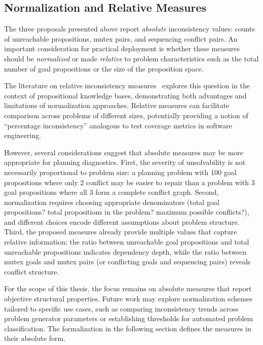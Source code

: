 \subsection{Normalization and Relative Measures}

The three proposals presented above report \emph{absolute} inconsistency values: counts of unreachable propositions, mutex pairs, and sequencing conflict pairs. An important consideration for practical deployment is whether these measures should be \emph{normalized} or made \emph{relative} to problem characteristics such as the total number of goal propositions or the size of the proposition space.

The literature on relative inconsistency measures~\cite{Besnard2020} explores this question in the context of propositional knowledge bases, demonstrating both advantages and limitations of normalization approaches. Relative measures can facilitate comparison across problems of different sizes, potentially providing a notion of ``percentage inconsistency'' analogous to test coverage metrics in software engineering.

However, several considerations suggest that absolute measures may be more appropriate for planning diagnostics. First, the severity of unsolvability is not necessarily proportional to problem size: a planning problem with 100 goal propositions where only 2 conflict may be easier to repair than a problem with 3 goal propositions where all 3 form a complete conflict graph. Second, normalization requires choosing appropriate denominators (total goal propositions? total propositions in the problem? maximum possible conflicts?), and different choices encode different assumptions about problem structure. Third, the proposed measures already provide multiple values that capture relative information: the ratio between unreachable goal propositions and total unreachable propositions indicates dependency depth, while the ratio between mutex goals and mutex pairs (or conflicting goals and sequencing pairs) reveals conflict structure.

For the scope of this thesis, the focus remains on absolute measures that report objective structural properties. Future work may explore normalization schemes tailored to specific use cases, such as comparing inconsistency trends across problem generator parameters or establishing thresholds for automated problem classification. The formalization in the following section defines the measures in their absolute form.
